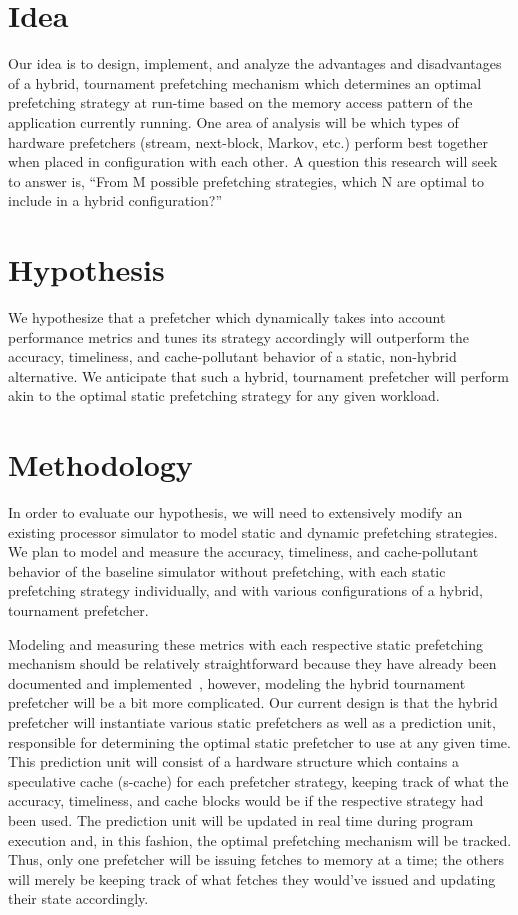 \documentclass[pageno]{jpaper}
\begin{document}
\section{Idea}

Our idea is to design, implement, and analyze the advantages and disadvantages of a hybrid, 
tournament prefetching mechanism which determines an optimal prefetching strategy at run-time 
based on the memory access pattern of the application currently running. One area of analysis 
will be which types of hardware prefetchers (stream, next-block, Markov, etc.) perform best 
together when placed in configuration with each other. A question this research will seek to 
answer is, “From M possible prefetching strategies, which N are optimal to include in a 
hybrid configuration?”

\section{Hypothesis}

We hypothesize that a prefetcher which dynamically takes into account performance metrics 
and tunes its strategy accordingly will outperform the accuracy, timeliness, and cache-pollutant 
behavior of a static, non-hybrid alternative. We anticipate that such a hybrid, tournament 
prefetcher will perform akin to the optimal static prefetching strategy for any given workload.

\section{Methodology}

In order to evaluate our hypothesis, we will need to extensively modify an existing processor 
simulator to model static and dynamic prefetching strategies. We plan to model and measure the 
accuracy, timeliness, and cache-pollutant behavior of the baseline simulator without prefetching, 
with each static prefetching strategy individually, and with various configurations of a hybrid, 
tournament prefetcher.

Modeling and measuring these metrics with each respective static prefetching mechanism should be 
relatively straightforward because they have already been documented and implemented~\cite{srinath07}, however, 
modeling the hybrid tournament prefetcher will be a bit more complicated. Our current design is 
that the hybrid prefetcher will instantiate various static prefetchers as well as a prediction unit, 
responsible for determining the optimal static prefetcher to use at any given time. This prediction unit 
will consist of a hardware structure which contains a speculative cache (s-cache) for each prefetcher 
strategy, keeping track of what the accuracy, timeliness, and cache blocks would be if the respective 
strategy had been used. The prediction unit will be updated in real time during program execution and, 
in this fashion, the optimal prefetching mechanism will be tracked. Thus, only one prefetcher will be 
issuing fetches to memory at a time; the others will merely be keeping track of what fetches they would’ve 
issued and updating their state accordingly.
\end{document}
